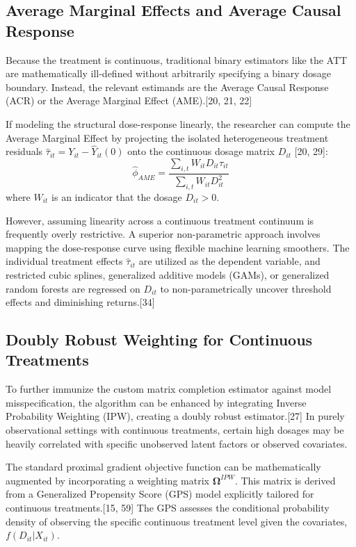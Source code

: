 \documentclass{article}
\begin{document}
\subsection{Average Marginal Effects and Average Causal Response}

Because the treatment is continuous, traditional binary estimators like the ATT are mathematically ill-defined without arbitrarily specifying a binary dosage boundary. Instead, the relevant estimands are the Average Causal Response (ACR) or the Average Marginal Effect (AME).[20, 21, 22]

If modeling the structural dose-response linearly, the researcher can compute the Average Marginal Effect by projecting the isolated heterogeneous treatment residuals $\hat{\tau}_{it} = Y_{it} - \hat{Y}_{it}(0)$ onto the continuous dosage matrix $D_{it}$ [20, 29]:
$$\hat{\phi}_{AME} = \frac{\sum_{i,t} W_{it} D_{it} \hat{\tau}_{it}}{\sum_{i,t} W_{it} D_{it}^2}$$
where $W_{it}$ is an indicator that the dosage $D_{it} > 0$. 

However, assuming linearity across a continuous treatment continuum is frequently overly restrictive. A superior non-parametric approach involves mapping the dose-response curve using flexible machine learning smoothers. The individual treatment effects $\hat{\tau}_{it}$ are utilized as the dependent variable, and restricted cubic splines, generalized additive models (GAMs), or generalized random forests are regressed on $D_{it}$ to non-parametrically uncover threshold effects and diminishing returns.[34] 

\subsection{Doubly Robust Weighting for Continuous Treatments}

To further immunize the custom matrix completion estimator against model misspecification, the algorithm can be enhanced by integrating Inverse Probability Weighting (IPW), creating a doubly robust estimator.[27] In purely observational settings with continuous treatments, certain high dosages may be heavily correlated with specific unobserved latent factors or observed covariates.

The standard proximal gradient objective function can be mathematically augmented by incorporating a weighting matrix $\mathbf{\Omega}^{IPW}$. This matrix is derived from a Generalized Propensity Score (GPS) model explicitly tailored for continuous treatments.[15, 59] The GPS assesses the conditional probability density of observing the specific continuous treatment level given the covariates, $f(D_{it} | X_{it})$.
\end{document}
